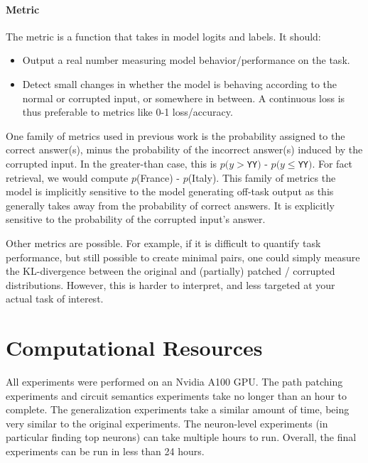 \documentclass{article}
\newcommand{\YY}{\texttt{YY}}
\begin{document}
    \paragraph{Metric} The metric is a function that takes in model logits and labels. It should:

    \begin{itemize}
        \item Output a real number measuring model behavior/performance on the task.
        \item Detect small changes in whether the model is behaving according to the normal or corrupted input, or somewhere in between. A continuous loss is thus preferable to metrics like 0-1 loss/accuracy.
    \end{itemize} 
    
    One family of metrics used in previous work is the probability assigned to the correct answer(s), minus the probability of the incorrect answer(s) induced by the corrupted input. In the greater-than case, this is $p(y>$\YY$)$ - $p(y\leq$\YY$)$. For fact retrieval, we would compute $p$(France) - $p$(Italy). This family of metrics the model is implicitly sensitive to the model generating off-task output as this generally takes away from the probability of correct answers. It is explicitly sensitive to the probability of the corrupted input’s answer.

    Other metrics are possible. For example, if it is difficult to quantify task performance, but still possible to create minimal pairs, one could simply measure the KL-divergence between the original and (partially) patched / corrupted distributions. However, this is harder to interpret, and less targeted at your actual task of interest.

    \section{Computational Resources}
    All experiments were performed on an Nvidia A100 GPU. The path patching experiments and circuit semantics experiments take no longer than an hour to complete. The generalization experiments take a similar amount of time, being very similar to the original experiments. The neuron-level experiments (in particular finding top neurons) can take multiple hours to run. Overall, the final experiments can be run in less than 24 hours.

	
\end{document}
